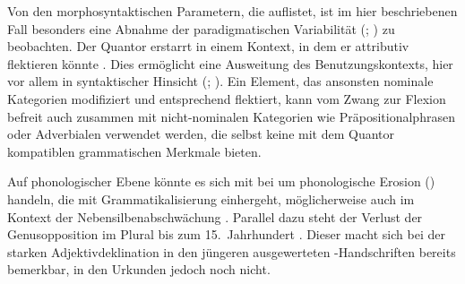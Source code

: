 Von den morphosyntaktischen Parametern, die \citet[174]{lehmann2015} auflistet,
ist im hier beschriebenen Fall besonders eine Abnahme der paradigmatischen
Variabilität (; \cite[146--150]{lehmann2015}) zu
beobachten. Der Quantor erstarrt in einem Kontext, in dem er attributiv
flektieren könnte . Dies ermöglicht eine Ausweitung des
Benutzungskontexts, hier vor allem in syntaktischer Hinsicht (; \cite[150--151]{lehmann2015}). Ein Element, das
ansonsten nominale Kategorien modifiziert und entsprechend flektiert, kann vom
Zwang zur Flexion befreit auch zusammen mit nicht-nominalen Kategorien wie
Präpositionalphrasen oder Adverbialen verwendet werden, die selbst keine mit
dem Quantor kompatiblen grammatischen Merkmale bieten.

Auf phonologischer Ebene könnte es sich mit \citet[134--136]{lehmann2015} bei
 um phonologische Erosion () handeln,
die mit Grammatikalisierung einhergeht, möglicherweise auch im Kontext der
Nebensilbenabschwächung \autocite[88--92]{braune2018}. Parallel dazu steht der
Verlust der Genusopposition im Plural bis zum 15.~Jahrhundert
\autocites[203]{paul2007}[191--192]{reichmannwegera1993}. Dieser macht sich bei
der starken Adjektivdeklination in den jüngeren ausgewerteten
\KC{}-Handschriften bereits bemerkbar, in den Urkunden jedoch noch nicht.

